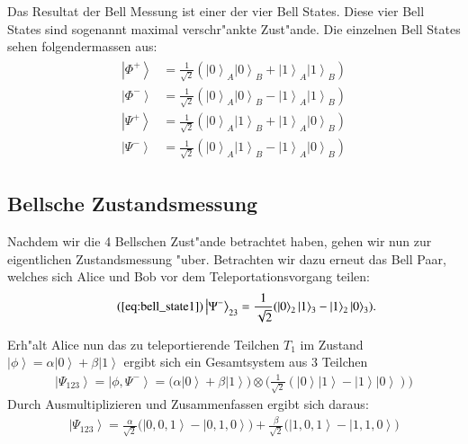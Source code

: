 \begin{refsection}
Das Resultat der Bell Messung ist einer der vier Bell States. Diese vier Bell States sind sogenannt maximal verschr"ankte Zust"ande. Die einzelnen Bell States sehen folgendermassen aus:
\begin{align}
	\begin{split}
\left|\Phi^+\right\rangle & = \frac{1}{\sqrt{2}}(\left|0\right\rangle_{A}\left|0\right\rangle_{B} + \left|1\right\rangle_{A}\left|1\right\rangle_{B}) \\
\left|\Phi^-\right\rangle & = \frac{1}{\sqrt{2}}(\left|0\right\rangle_{A}\left|0\right\rangle_{B} - \left|1\right\rangle_{A}\left|1\right\rangle_{B}) \\
\left|\Psi^+\right\rangle & = \frac{1}{\sqrt{2}}(\left|0\right\rangle_{A}\left|1\right\rangle_{B} + \left|1\right\rangle_{A}\left|0\right\rangle_{B}) \\
\left|\Psi^-\right\rangle & = \frac{1}{\sqrt{2}}(\left|0\right\rangle_{A}\left|1\right\rangle_{B} - \left|1\right\rangle_{A}\left|0\right\rangle_{B}) 
	\end{split}
\end{align}

\subsection{Bellsche Zustandsmessung}\label{sec:bell-measurement}
%

Nachdem wir die 4 Bellschen Zust"ande betrachtet haben, gehen wir nun zur eigentlichen Zustandsmessung "uber. Betrachten wir dazu erneut das Bell Paar, welches sich Alice und Bob vor dem Teleportationsvorgang teilen:
\begin{align}  \tag{\ref{eq:bell_state1}}
 \left|\Psi^{-}\right\rangle_{23} = \frac{1}{\sqrt{2}} ( \left|0\right\rangle_{2}\left|1\right\rangle_{3} - \left|1\right\rangle_{2}\left|0\right\rangle_{3} ).
\end{align}

Erh"alt Alice nun das zu teleportierende Teilchen $T_{1}$ im Zustand $\left|\phi\right\rangle = \alpha\left|0\right\rangle + \beta\left|1\right\rangle$ ergibt sich ein Gesamtsystem aus 3 Teilchen
\begin{align}\label{eq:full_system1}
\left|\Psi_{123}\right\rangle = \left| \phi, \Psi^{-} \right\rangle = \big( \alpha \left| 0 \right\rangle + \beta \left| 1 \right\rangle \big) \otimes \big( \frac{1}{\sqrt{2}} ( \left|0\right\rangle \left|1\right\rangle - \left|1\right\rangle \left|0\right\rangle ) \big)
\end{align}
Durch Ausmultiplizieren und Zusammenfassen ergibt sich daraus:
\begin{align}\label{eq:full_system2}
\left|\Psi_{123}\right\rangle = \frac{\alpha}{\sqrt{2}} \big(\left|0, 0, 1 \right\rangle - \left|0, 1, 0 \right\rangle  \big) + \frac{\beta}{\sqrt{2}} \big(\left|1, 0, 1 \right\rangle - \left|1, 1, 0 \right\rangle \big)
\end{align}


\end{refsection}
